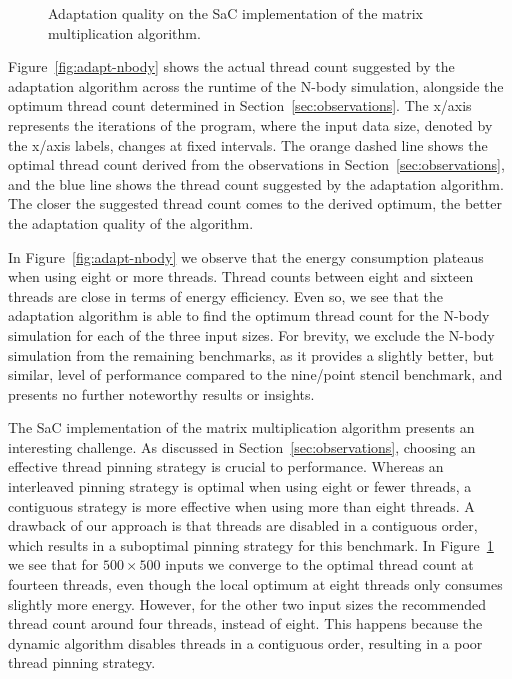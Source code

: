 \begin{figure}[ht]
  \scriptsize
  \captionsetup{width=.45\linewidth}
  \begin{minipage}{0.50\linewidth}
    \centering
    \caption{Adaptation quality on the SaC implementation of the N-body simulation.}%
    \label{fig:adapt-nbody}
  \end{minipage}%
  \begin{minipage}{0.50\linewidth}
    \centering
    \caption{Adaptation quality on the SaC implementation of the matrix multiplication algorithm.}%
    \label{fig:adapt-matmul}
  \end{minipage}%
\end{figure}

Figure~\ref{fig:adapt-nbody} shows the actual thread count suggested by the adaptation algorithm across the runtime of the N-body simulation, alongside the optimum thread count determined in Section~\ref{sec:observations}.
The x\-/axis represents the iterations of the program, where the input data size, denoted by the x\-/axis labels, changes at fixed intervals.
The orange dashed line shows the optimal thread count derived from the observations in Section~\ref{sec:observations}, and the blue line shows the thread count suggested by the adaptation algorithm.
The closer the suggested thread count comes to the derived optimum, the better the adaptation quality of the algorithm.

In Figure~\ref{fig:adapt-nbody} we observe that the energy consumption plateaus when using eight or more threads.
Thread counts between eight and sixteen threads are close in terms of energy efficiency.
Even so, we see that the adaptation algorithm is able to find the optimum thread count for the N-body simulation for each of the three input sizes.
For brevity, we exclude the N-body simulation from the remaining benchmarks, as it provides a slightly better, but similar, level of performance compared to the nine\-/point stencil benchmark, and presents no further noteworthy results or insights.

The SaC implementation of the matrix multiplication algorithm presents an interesting challenge.
As discussed in Section~\ref{sec:observations}, choosing an effective thread pinning strategy is crucial to performance.
Whereas an interleaved pinning strategy is optimal when using eight or fewer threads, a contiguous strategy is more effective when using more than eight threads.
A drawback of our approach is that threads are disabled in a contiguous order, which results in a suboptimal pinning strategy for this benchmark.
In Figure~\ref{fig:adapt-matmul} we see that for $500 \times 500$ inputs we converge to the optimal thread count at fourteen threads, even though the local optimum at eight threads only consumes slightly more energy.
However, for the other two input sizes the recommended thread count around four threads, instead of eight.
This happens because the dynamic algorithm disables threads in a contiguous order, resulting in a poor thread pinning strategy.

